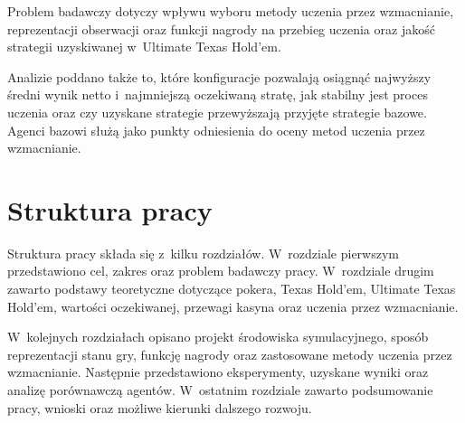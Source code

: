 Problem badawczy dotyczy wpływu wyboru metody
uczenia przez wzmacnianie, reprezentacji obserwacji oraz funkcji nagrody na
przebieg uczenia oraz jakość strategii uzyskiwanej w~Ultimate Texas Hold’em.

Analizie poddano także to, które konfiguracje pozwalają osiągnąć najwyższy
średni wynik netto i~najmniejszą oczekiwaną stratę, jak stabilny jest proces
uczenia oraz czy uzyskane strategie przewyższają przyjęte strategie bazowe.
Agenci bazowi służą jako punkty odniesienia do oceny metod uczenia przez wzmacnianie.

\section{Struktura pracy}

Struktura pracy składa się z~kilku rozdziałów. W~rozdziale pierwszym przedstawiono cel,
zakres oraz problem badawczy pracy. W~rozdziale drugim zawarto podstawy teoretyczne
dotyczące pokera, Texas Hold’em, Ultimate Texas Hold’em, wartości oczekiwanej,
przewagi kasyna oraz uczenia przez wzmacnianie.

W~kolejnych rozdziałach opisano projekt środowiska symulacyjnego,
sposób reprezentacji stanu gry, funkcję nagrody oraz zastosowane metody uczenia
przez wzmacnianie. Następnie przedstawiono eksperymenty, uzyskane
wyniki oraz analizę porównawczą agentów. W~ostatnim rozdziale zawarto
podsumowanie pracy, wnioski oraz możliwe kierunki dalszego rozwoju.
